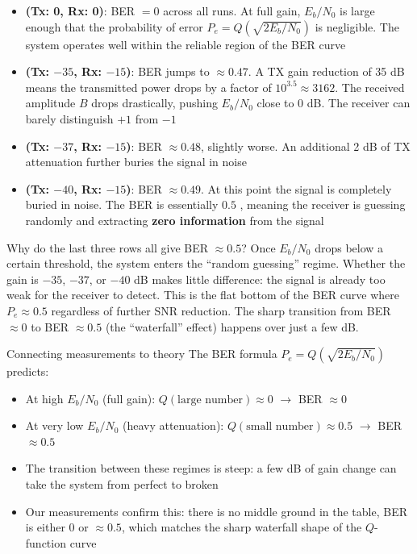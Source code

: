 \begin{itemize}
\item \textbf{(Tx: 0, Rx: 0)}: BER $= 0$ across all runs. At full gain, $E_b/N_0$ is large enough that the probability of error $P_e = Q(\sqrt{2E_b/N_0})$ is negligible. The system operates well within the reliable region of the BER curve

\item \textbf{(Tx: $-35$, Rx: $-15$)}: BER jumps to $\approx 0.47$. A TX gain reduction of 35 dB means the transmitted power drops by a factor of $10^{3.5} \approx 3162$. The received amplitude $B$ drops drastically, pushing $E_b/N_0$ close to 0 dB. The receiver can barely distinguish $+1$ from $-1$

\item \textbf{(Tx: $-37$, Rx: $-15$)}: BER $\approx 0.48$, slightly worse. An additional 2 dB of TX attenuation further buries the signal in noise

\item \textbf{(Tx: $-40$, Rx: $-15$)}: BER $\approx 0.49$. At this point the signal is completely buried in noise. The BER is essentially $0.5$ , meaning the receiver is guessing randomly and extracting \textbf{zero information} from the signal
\end{itemize}

\begin{IntuitionBox}{Why do the last three rows all give BER $\approx 0.5$?}
Once $E_b/N_0$ drops below a certain threshold, the system enters the ``random guessing'' regime. Whether the gain is $-35$, $-37$, or $-40$ dB makes little difference: the signal is already too weak for the receiver to detect. This is the flat bottom of the BER curve where $P_e \approx 0.5$ regardless of further SNR reduction. The sharp transition from BER $\approx 0$ to BER $\approx 0.5$ (the ``waterfall'' effect) happens over just a few dB.
\end{IntuitionBox}

\begin{KeyBox}{Connecting measurements to theory}
The BER formula $P_e = Q(\sqrt{2E_b/N_0})$ predicts:
\begin{itemize}
\item At high $E_b/N_0$ (full gain): $Q(\text{large number}) \approx 0$ $\rightarrow$ BER $\approx 0$
\item At very low $E_b/N_0$ (heavy attenuation): $Q(\text{small number}) \approx 0.5$ $\rightarrow$ BER $\approx 0.5$
\item The transition between these regimes is steep: a few dB of gain change can take the system from perfect to broken
\item Our measurements confirm this: there is no middle ground in the table, BER is either 0 or $\approx 0.5$, which matches the sharp waterfall shape of the $Q$-function curve
\end{itemize}
\end{KeyBox}

